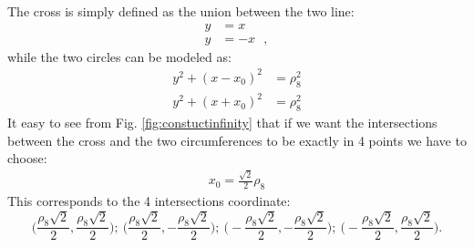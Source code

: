 The cross is simply defined as the union between the two line:
\begin{subequations}
\begin{align}
y &= x \\[5pt]
y &= -x \ \ \  ,
\end{align}
\end{subequations}
while the two circles can be modeled as:
\begin{subequations}
\begin{align}
y^2 + (x - x_0)^2 &= \rho_{8}^2 \\[10pt]
y^2 + (x + x_0)^2 &= \rho_{8}^2 
\end{align}
\end{subequations}
It easy to see from Fig. \ref{fig:constuctinfinity} that if we want the intersections between the cross and the two circumferences to be exactly in 4 points we have to choose:
\begin{align}
x_0 = \frac{\sqrt{2}}{2}\rho_{8}
\end{align}
This corresponds to the 4 intersections coordinate:
$$
\Big(\frac{\rho_{8}\sqrt{2}}{2},\frac{\rho_{8}\sqrt{2}}{2}\Big); \ 
\Big(\frac{\rho_{8}\sqrt{2}}{2},-\frac{\rho_{8}\sqrt{2}}{2}\Big); \
\Big(-\frac{\rho_{8}\sqrt{2}}{2},-\frac{\rho_{8}\sqrt{2}}{2}\Big); \
\Big(-\frac{\rho_{8}\sqrt{2}}{2},\frac{\rho_{8}\sqrt{2}}{2}\Big).
$$

